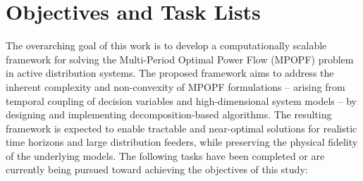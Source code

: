 \section{Objectives and Task Lists}
The overarching goal of this work is to develop a computationally scalable framework for solving the Multi-Period Optimal Power Flow (MPOPF) problem in active distribution systems. The proposed framework aims to address the inherent complexity and non-convexity of MPOPF formulations -- arising from temporal coupling of decision variables and high-dimensional system models -- by designing and implementing decomposition-based algorithms. The resulting framework is expected to enable tractable and near-optimal solutions for realistic time horizons and large distribution feeders, while preserving the physical fidelity of the underlying models. The following tasks have been completed or are currently being pursued toward achieving the objectives of this study:

